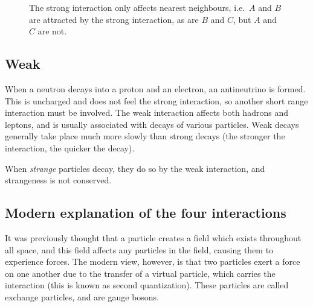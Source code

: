 \begin{figure}
\caption{The strong interaction only affects nearest neighbours, i.e.\ $A$ and $B$ are attracted by the strong interaction, as are $B$ and $C$, but $A$ and $C$ are not.}
\end{figure}

\subsection{Weak}

When a neutron decays into a proton and an electron, an antineutrino is formed.  This is uncharged and does not feel the strong interaction, so another short range interaction must be involved.  The weak interaction affects both hadrons and leptons, and is usually associated with decays of various particles.  Weak decays generally take place much more slowly than strong decays (the stronger the interaction, the quicker the decay).

When \emph{strange} particles decay, they do so by the weak interaction, and strangeness is not conserved.

\subsection{Modern explanation of the four interactions}

It was previously thought that a particle creates a field which exists throughout all space, and this field affects any particles in the field, causing them to experience forces.  The modern view, however, is that two particles exert a force on one another due to the transfer of a virtual particle, which carries the interaction (this is known as second quantization).  These particles are called exchange particles, and are gauge bosons.

